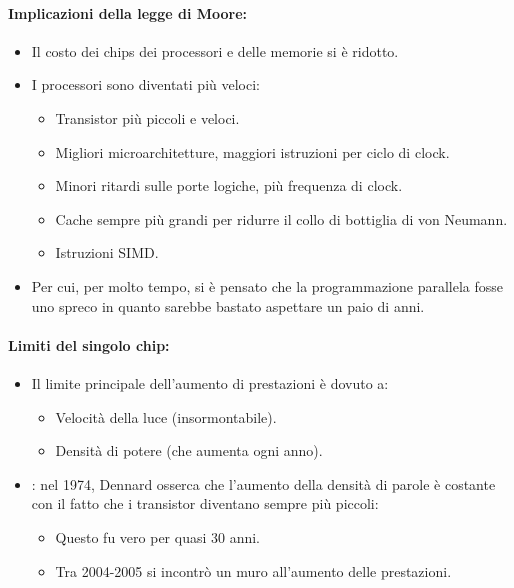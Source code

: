 \paragraph{Implicazioni della legge di Moore:}

\begin{itemize}
  \item Il costo dei chips dei processori e delle memorie si è ridotto. 
  \item I processori sono diventati più veloci: 
    \begin{itemize}
      \item Transistor più piccoli e veloci. 
      \item Migliori microarchitetture, maggiori istruzioni per ciclo di clock. 
      \item Minori ritardi sulle porte logiche, più frequenza di clock. 
      \item Cache sempre più grandi per ridurre il collo di bottiglia di von Neumann. 
      \item Istruzioni SIMD.
    \end{itemize}
  \item Per cui, per molto tempo, si è pensato che la programmazione parallela fosse uno spreco in quanto sarebbe bastato aspettare un paio di anni.
\end{itemize}

\paragraph{Limiti del singolo chip:}

\begin{itemize}
  \item Il limite principale dell'aumento di prestazioni è dovuto a: 
    \begin{itemize}
      \item Velocità della luce (insormontabile). 
      \item Densità di potere (che aumenta ogni anno).
    \end{itemize}
  \item {}: nel 1974, Dennard osserca che l'aumento della densità di parole è costante con il fatto che i transistor diventano sempre più piccoli:
    \begin{itemize}
      \item Questo fu vero per quasi 30 anni. 
      \item Tra 2004-2005 si incontrò un muro all'aumento delle prestazioni.
    \end{itemize}
\end{itemize}




